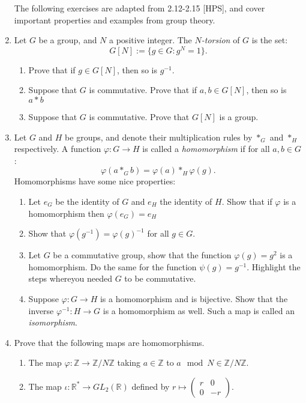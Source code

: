 \documentclass[11pt]{article}
\newcommand{\bR}{\mathbb{R}}
\newcommand{\bZ}{\mathbb{Z}}
\begin{document}
\begin{enumerate}
  The following exercises are adapted from 2.12-2.15 [HPS], and cover important properties and examples from group theory.
  \item{
  Let $G$ be a group, and $N$ a positive integer.  The \textit{$N$-torsion} of $G$ is the set:
  \[G[N]:=\{g\in G:g^N = 1\}.\]
  \begin{enumerate}
    \item{
    Prove that if $g\in G[N]$, then so is $g^{-1}$.
    }
    \item{
    Suppose that $G$ is commutative.  Prove that if $a,b\in G[N]$, then so is $a*b$
    }
    \item{
    Suppose that $G$ is commutative.  Prove that $G[N]$ is a group.
    }
  \end{enumerate}
  }
  \item{
  Let $G$ and $H$ be groups, and denote their multiplication rules by $*_G$ and $*_H$ respectively.  A function $\varphi:G\to H$ is called a \textit{homomorphism} if for all $a,b\in G$:
  \[\varphi(a*_G b) = \varphi(a)*_H\varphi(g).\]
  Homomorphisms have some nice properties:
  \begin{enumerate}
    \item{
    Let $e_G$ be the identity of $G$ and $e_H$ the identity of $H$.  Show that if $\varphi$ is a homomorphism then $\varphi(e_G) = e_H$
    }
    \item{
    Show that $\varphi(g^{-1})=\varphi(g)^{-1}$ for all $g\in G$.
    }
    \item{
    Let $G$ be a commutative group, show that the function $\varphi(g) = g^2$ is a homomorphism.  Do the same for the function $\psi(g) = g^{-1}$.  Highlight the steps whereyou needed $G$ to be commutative.
    }
    \item{
    Suppose $\varphi:G\to H$ is a homomorphism and is bijective.  Show that the inverse $\varphi^{-1}:H\to G$ is a homomorphism as well.  Such a map is called an \textit{isomorphism}.
    }
  \end{enumerate}
  }
  \item{
  Prove that the following maps are homomorphisms.
  \begin{enumerate}
    \item{
    The map $\varphi:\bZ\to\bZ/N\bZ$ taking $a\in\bZ$ to $a\mod N\in\bZ/N\bZ$.
    }
    \item{
    The map $\iota:\bR^*\to GL_2(\bR)$ defined by $r\mapsto\begin{pmatrix}r&0\\0&-r\end{pmatrix}$.
}
\end{enumerate}}
\end{enumerate}
\end{document}
